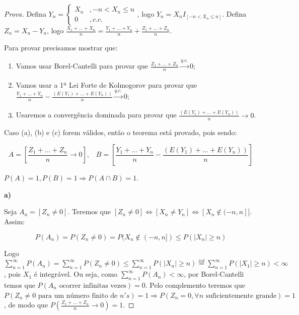 \documentclass[
]{article}
\theoremstyle{definition}
\theoremstyle{definition}
\theoremstyle{definition}
\theoremstyle{definition}
\theoremstyle{remark}
\begin{document}
\begin{proof}[Prova]
Defina \(Y_{n} = \begin{cases} X_{n} &, -n < X_{n} \le n \\ 0 &, c.c. \end{cases}\), logo \(Y_{n} = X_{n}I_{[-n < X_{n} \le n]}\). Defina \(Z_{n} = X_{n} - Y_{n}\), logo \(\frac{X_{1} + \ldots + X_{n}}{n} = \frac{Y_{1} + \ldots + Y_{n}}{n} + \frac{Z_{1} + \ldots + Z_{n}}{n}\).

Para provar precisamos mostrar que:

\begin{enumerate}
\def\labelenumi{\alph{enumi})}
\item
  Vamos usar Borel-Cantelli para provar que \(\frac{Z_{1} + \ldots + Z_{n}}{n} \xrightarrow[]{q.c.}0\);
\item
  Vamos usar a 1ª Lei Forte de Kolmogorov para provar que \(\frac{Y_{1} + \ldots + Y_{n}}{n} - \frac{(E(Y_1) + \ldots + E(Y_{n}))}{n} \xrightarrow[]{q.c.}0\);
\item
  Usaremos a convergência dominada para provar que \(\frac{(E(Y_1) + \ldots + E(Y_{n}))}{n} \to 0\).
\end{enumerate}

Caso (a), (b) e (c) forem válidos, então o teorema está provado, pois sendo:

\begin{equation*}
A = \left[\frac{Z_{1} + \ldots + Z_{n}}{n} \to 0\right], \; \; \; B = \left[\frac{Y_{1} + \ldots + Y_{n}}{n} - \frac{(E(Y_1) + \ldots + E(Y_{n}))}{n}\right]
\end{equation*}

\(P(A) = 1, P(B) = 1 \Rightarrow P(A \cap B) = 1\).

\textbf{a)}

Seja \(A_{n} = [Z_{n} \neq 0]\). Teremos que \([Z_{n} \neq 0] \Leftrightarrow [X_{n} \neq Y_{n}] \Leftrightarrow [X_{n} \not\in (-n,n]]\). Assim:

\begin{equation*}
P(A_{n}) = P(Z_{n} \neq 0) = P(X_{n} \not\in (-n,n]) \le P(|X_{n}| \ge n)
\end{equation*}

Logo \(\sum_{n=1}^{\infty}P(A_{n}) = \sum_{n=1}^{\infty}P(Z_{n} \neq 0) \le \sum_{n=1}^{\infty}P(|X_{n}| \ge n) \stackrel{iid}{=} \sum_{n=1}^{\infty}P(|X_{1}| \ge n) < \infty\), pois \(X_{1}\) é integrável. Ou seja, como \(\sum_{n=1}^{\infty}P(A_{n}) < \infty\), por Borel-Cantelli temos que \(P(A_{n} \text{ ocorrer infinitas vezes}) = 0\). Pelo complemento teremos que \(P(Z_{n} \neq 0 \text{ para um número finito de }n's) = 1 \Rightarrow P(Z_{n} = 0, \forall n \text{ suficientemente grande}) = 1\), de modo que \(P\left(\frac{Z_{1} + \ldots + Z_{n}}{n} \to 0\right) = 1\).


\end{proof}
\end{document}
